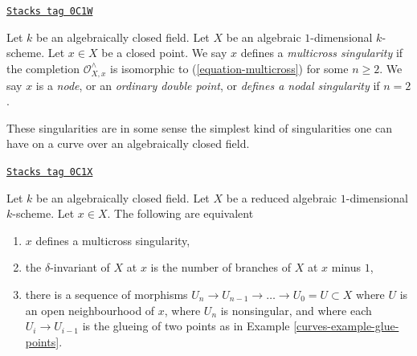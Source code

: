 \begin{definition}[Multicross]
\label{curves-definition-multicross}
\href{https://stacks.math.columbia.edu/tag/0C1W}{\texttt{Stacks tag 0C1W}}

Let $k$ be an algebraically closed field. Let $X$ be an algebraic
$1$-dimensional $k$-scheme. Let $x \in X$ be a closed point.
We say $x$ defines a {\it multicross singularity} if the completion
$\mathcal{O}_{X, x}^\wedge$
is isomorphic to (\ref{equation-multicross}) for some $n \geq 2$.
We say $x$ is a {\it node}, or an {\it ordinary double point}, or
{\it defines a nodal singularity} if $n = 2$.
\end{definition}

These singularities are in some sense the simplest kind of singularities
one can have on a curve over an algebraically closed field.

\begin{lemma}[Multicross]
\label{curves-lemma-multicross}
\href{https://stacks.math.columbia.edu/tag/0C1X}{\texttt{Stacks tag 0C1X}}

Let $k$ be an algebraically closed field. Let $X$ be a reduced algebraic
$1$-dimensional $k$-scheme. Let $x \in X$. The following are equivalent
\begin{enumerate}
\item $x$ defines a multicross singularity,
\item the $\delta$-invariant of $X$ at $x$ is the
number of branches of $X$ at $x$ minus $1$,
\item there is a sequence of morphisms
$U_n \to U_{n - 1} \to \ldots \to U_0 = U \subset X$
where $U$ is an open neighbourhood of $x$, where
$U_n$ is nonsingular, and where each $U_i \to U_{i - 1}$
is the glueing of two points as in Example \ref{curves-example-glue-points}.
\end{enumerate}
\end{lemma}

